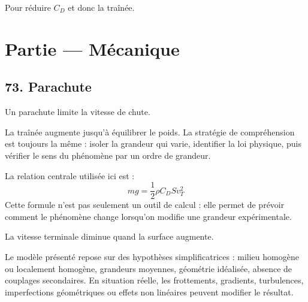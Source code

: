 \documentclass[11pt,a4paper]{article}
\begin{document}
\begin{corrigebox}[Indication]
Pour réduire $C_D$ et donc la traînée.
\end{corrigebox}


\section{Partie — Mécanique}


\subsection{73. Parachute}

\begin{exemplebox}
Un parachute limite la vitesse de chute.
\end{exemplebox}

\begin{methodebox}
La traînée augmente jusqu'à équilibrer le poids.
La stratégie de compréhension est toujours la même : isoler la grandeur qui varie, identifier la loi physique, puis vérifier le sens du phénomène par un ordre de grandeur.
\end{methodebox}

\begin{theorembox}
La relation centrale utilisée ici est :
\[
mg=\frac12\rho C_D S v_T^2
\]
Cette formule n'est pas seulement un outil de calcul : elle permet de prévoir comment le phénomène change lorsqu'on modifie une grandeur expérimentale.
\end{theorembox}

\begin{odgbox}
La vitesse terminale diminue quand la surface augmente.
\end{odgbox}

\begin{attentionbox}
Le modèle présenté repose sur des hypothèses simplificatrices : milieu homogène ou localement homogène, grandeurs moyennes, géométrie idéalisée, absence de couplages secondaires. En situation réelle, les frottements, gradients, turbulences, imperfections géométriques ou effets non linéaires peuvent modifier le résultat.
\end{attentionbox}
\end{document}
